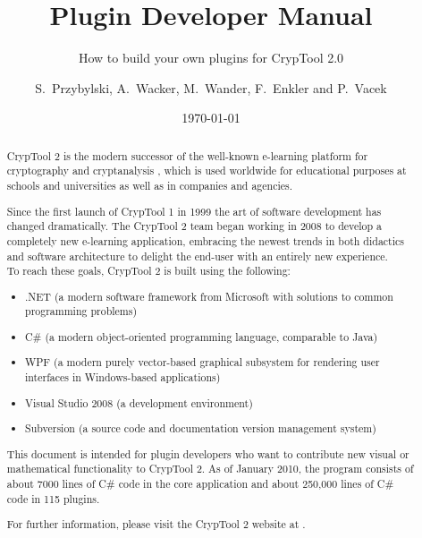 \documentclass[11pt, a4paper, titlepage]{scrreprt}
\title{Plugin Developer Manual}
\subtitle{How to build your own plugins for CrypTool 2.0}
\author{S.\ Przybylski, A.\ Wacker, M.\ Wander, F.\ Enkler and P.\ Vacek}
\date{\today}
\makeatletter
\newcommand\WaterMarkPic{%
    \setlength{\@tempdimb}{1.85cm}%
    \setlength{\@tempdimc}{2.7cm}%
    \setlength{\unitlength}{1pt}%
    \put(\strip@pt\@tempdimb,\strip@pt\@tempdimc){
            \texttt{[image: figures/ct\_logo\_watermark]}%
    }
}
\makeatother
\begin{document}
	\maketitle

	\begin{abstract}
CrypTool 2 is the modern successor of the well-known e-learning platform for cryptography and cryptanalysis , which is used worldwide for educational purposes at schools and universities as well as in companies and agencies.

Since the first launch of CrypTool 1 in 1999 the art of software development has changed dramatically. The CrypTool 2 team began working in 2008 to develop a completely new e-learning application, embracing the newest trends in both didactics and software architecture to delight the end-user with an entirely new experience.\\

To reach these goals, CrypTool 2 is built using the following:

\begin{itemize}
	\item .NET (a modern software framework from Microsoft with solutions to common programming problems)
	\item C\# (a modern object-oriented programming language, comparable to Java)
    \item WPF (a modern purely vector-based graphical subsystem for rendering user interfaces in Windows-based applications)
    \item Visual Studio 2008 (a development environment)
	\item Subversion (a source code and documentation version management system)
\end{itemize}

This document is intended for plugin developers who want to contribute new visual or mathematical functionality to CrypTool 2. As of January 2010, the program consists of about 7000 lines of C\# code in the core application and about 250,000 lines of C\# code in 115 plugins.

For further information, please visit the CrypTool 2 website at  .
    \end{abstract}

	\tableofcontents
    \listoffigures

    \AddToShipoutPicture{\WaterMarkPic}

	
	
\end{document}
